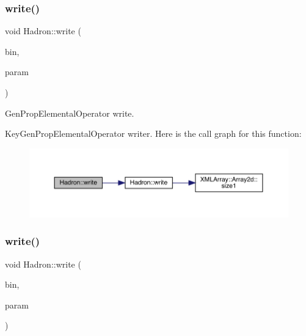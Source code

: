 \subsubsection{\texorpdfstring{write()}{write()}\hspace{0.1cm}{\footnotesize\ttfamily [61/95]}}
{\footnotesize\ttfamily void Hadron\+::write (\begin{DoxyParamCaption}\item[{\mbox{\hyperlink{classADATIO_1_1BinaryWriter}{Binary\+Writer}} \&}]{bin,  }\item[{const \mbox{\hyperlink{structHadron_1_1KeyGenPropElementalOperator__t}{Key\+Gen\+Prop\+Elemental\+Operator\+\_\+t}} \&}]{param }\end{DoxyParamCaption})}



Gen\+Prop\+Elemental\+Operator write. 

Key\+Gen\+Prop\+Elemental\+Operator writer. Here is the call graph for this function\+:\nopagebreak
\begin{figure}[H]
\begin{center}
\leavevmode
\includegraphics[width=350pt]{d1/daf/namespaceHadron_af1d6496318c689e52be27a9f842ccc2d_cgraph}
\end{center}
\end{figure}
\mbox{\label{namespaceHadron_a97d7de65e3fea244c875c2cb76decfda}} 
\subsubsection{\texorpdfstring{write()}{write()}\hspace{0.1cm}{\footnotesize\ttfamily [62/95]}}
{\footnotesize\ttfamily void Hadron\+::write (\begin{DoxyParamCaption}\item[{\mbox{\hyperlink{classADATIO_1_1BinaryWriter}{Binary\+Writer}} \&}]{bin,  }\item[{const \mbox{\hyperlink{structHadron_1_1HadronAdjMapTarget__t}{Hadron\+Adj\+Map\+Target\+\_\+t}} \&}]{param }\end{DoxyParamCaption})}

